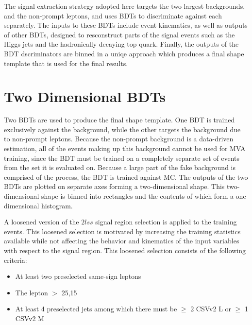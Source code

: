 The signal extraction strategy adopted here targets the two largest backgrounds, \ttv and the non-prompt leptons, and uses BDTs to discriminate against each separately.
The inputs to these BDTs include event kinematics, as well as outputs of other BDTs, designed to resconstruct parts of the signal events such as the Higgs jets and the
hadronically decaying top quark. Finally, the outputs of the BDT dscriminators are binned in a uniqe approach which produces a final shape template that is used
for the final results.

\section{Two Dimensional BDTs}
Two BDTs are used to produce the final shape template. One BDT is trained exclusively against the \ttv background, while the other targets the background due to non-prompt
leptons. Because the non-prompt background is a data-driven estimation, all of the events making up this background cannot be used for MVA training, since the BDT must be
trained on a completely separate set of events from the set it is evaluated on. Because a large part of the fake background is comprised of the \ttbar process, the BDT is
trained against \ttbar MC. The outputs of the two BDTs are plotted on separate axes forming a two-dimensional shape. This two-dimensional shape is binned into rectangles
and the contents of which form a one-dimensional histogram. 

A loosened version of the $2lss$ signal region selection is applied to the training events. This loosened selection is motivated by increasing the training statistics available
while not affecting the behavior and kinematics of the input variables with respect to the signal region. This loosened selection consists of the following criteria:
\begin{itemize}
\item At least two preselected same-sign leptons
\item The lepton \pt $>$ 25,15 
\item At least 4 preselected jets among which there must be $\geq$ 2 CSVv2 L or $\geq$ 1 CSVv2 M
\end{itemize}

